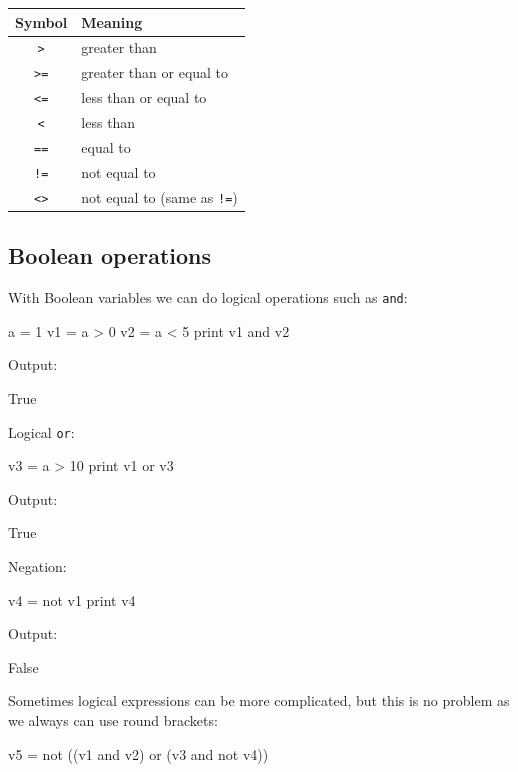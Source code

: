 \begin{center}
\begin{tabular}{|c|l|}
\hline
Symbol & Meaning \\
\hline
{\tt >} & greater than\\
{\tt >=} & greater than or equal to\\
{\tt <=} & less than or equal to\\
{\tt <} & less than\\
{\tt ==} & equal to\\
{\tt !=} & not equal to\\
{\tt <>} & not equal to (same as {\tt !=})\\
\hline
\end{tabular}
\end{center}

\subsection{Boolean operations}

With Boolean variables we can do logical operations such as {\tt and}:

\begin{bluecode}
a = 1
v1 = a > 0
v2 = a < 5
print v1 and v2
\end{bluecode}
Output:

\begin{greencode}
True
\end{greencode}
Logical {\tt or}:

\begin{bluecode}
v3 = a > 10
print v1 or v3
\end{bluecode}
Output:

\begin{greencode}
True
\end{greencode}
Negation:

\begin{bluecode}
v4 = not v1
print v4
\end{bluecode}
Output:

\begin{greencode}
False
\end{greencode}
Sometimes logical expressions can be more complicated, but this is no problem
as we always can use round brackets: 

\begin{bluecode}
v5 = not ((v1 and v2) or (v3 and not v4))
\end{bluecode}


